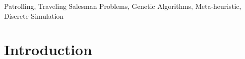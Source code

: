 \documentclass[preprint,review, 11pt,3p,authoryear]{elsarticle}
\newcommand{\rev}{\color{black}} %
\begin{document}
\begin{frontmatter}
\begin{abstract}
\end{abstract}

\begin{keyword}
Patrolling, Traveling Salesman Problems, Genetic Algorithms, Meta-heuristic, Discrete Simulation
\end{keyword}

\end{frontmatter}


\section{Introduction}
\label{intro}
\end{document}
